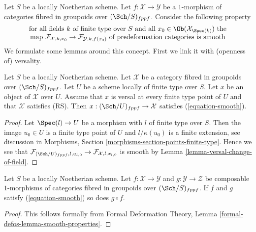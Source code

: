\noindent
Let $S$ be a locally Noetherian scheme.
Let $f : \mathcal{X} \to \mathcal{Y}$ be a $1$-morphism of categories
fibred in groupoids over $(\Sch/S)_{fppf}$. Consider the following property
\begin{equation}
\label{equation-smooth}
\begin{matrix}
\text{for all fields }k\text{ of finite type over }S
\text{ and all }x_0 \in \Ob(\mathcal{X}_{\Spec(k)})\text{ the}\\
\text{map }
\mathcal{F}_{\mathcal{X}, k, x_0} \to \mathcal{F}_{\mathcal{Y}, k, f(x_0)}
\text{ of predeformation categories is smooth}
\end{matrix}
\end{equation}
We formulate some lemmas around this concept. First we link it with
(openness of) versality.

\begin{lemma}
\label{lemma-versal-smooth}
Let $S$ be a locally Noetherian scheme. Let $\mathcal{X}$ be a category
fibred in groupoids over $(\Sch/S)_{fppf}$. Let $U$ be a scheme locally
of finite type over $S$. Let $x$ be an object of $\mathcal{X}$ over $U$.
Assume that $x$ is versal at every finite type point of $U$ and that
$\mathcal{X}$ satisfies (RS). Then $x : (\Sch/U)_{fppf} \to \mathcal{X}$
satisfies (\ref{equation-smooth}).
\end{lemma}

\begin{proof}
Let $\Spec(l) \to U$ be a morphism with $l$ of finite type over $S$.
Then the image $u_0 \in U$ is a finite type point of $U$ and
$l/\kappa(u_0)$ is a finite extension, see discussion in
Morphisms, Section \ref{morphisms-section-points-finite-type}.
Hence we see that
$\mathcal{F}_{(\Sch/U)_{fppf}, l, u_{l, 0}} \to
\mathcal{F}_{\mathcal{X}, l, x_{l, 0}}$
is smooth by Lemma \ref{lemma-versal-change-of-field}.
\end{proof}

\begin{lemma}
\label{lemma-composition-smooth}
Let $S$ be a locally Noetherian scheme. Let $f : \mathcal{X} \to \mathcal{Y}$
and $g : \mathcal{Y} \to \mathcal{Z}$ be composable $1$-morphisms of
categories fibred in groupoids over $(\Sch/S)_{fppf}$. If $f$ and $g$
satisfy (\ref{equation-smooth}) so does $g \circ f$.
\end{lemma}

\begin{proof}
This follows formally from Formal Deformation Theory, Lemma
\ref{formal-defos-lemma-smooth-properties}.
\end{proof}

